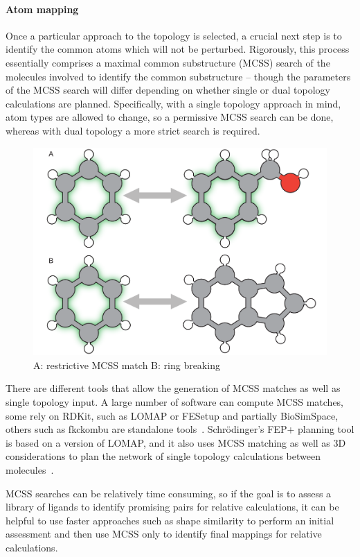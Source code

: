 \documentclass[9pt,bestpractices]{livecoms}
\begin{document}
\paragraph{Atom mapping}
Once a particular approach to the topology is selected, a crucial next step is to identify the common atoms which will not be perturbed.
Rigorously, this process essentially comprises a maximal common substructure (MCSS) search of the molecules involved to identify the common substructure -- though the parameters of the MCSS search will differ depending on whether single or dual topology calculations are planned.
Specifically, with a single topology approach in mind, atom types are allowed to change, so a permissive MCSS search can be done, whereas with dual topology a more strict search is required.
\begin{figure}
    \includegraphics[width=0.95\linewidth]{paper/figures/fig5_mcs/MCS.pdf}
    \caption{A: restrictive MCSS match B: ring breaking}
    \label{fig:fig5_mcss}
\end{figure} 

There are different tools that allow the generation of MCSS matches as well as single topology input. A large number of software can compute MCSS matches, some rely on RDKit, such as LOMAP or FESetup and partially BioSimSpace, others such as fkckombu are standalone tools~\cite{rdkit2019Dec,loeffler2015fesetup, liu2013lead, hedges2019biosimspace, kawabata20143d}. Schr\"{o}dinger's FEP+ planning tool is based on a version of LOMAP, and it also uses MCSS matching as well as 3D considerations to plan the network of single topology calculations between molecules~\cite{wang2015accurate}. 

MCSS searches can be relatively time consuming, so if the goal is to assess a library of ligands to identify promising pairs for relative calculations, it can be helpful to use faster approaches such as shape similarity to perform an initial assessment and then use MCSS only to identify final mappings for relative calculations.
\end{document}
